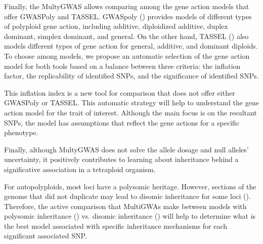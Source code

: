 \documentclass{article}
\begin{document}
Finally, the MultyGWAS allows comparing among the gene action models that offer GWASPoly and TASSEL.  GWASpoly (\cite{Rosyara2016}) provides models of different types of polyploid gene action, including additive, diploidized additive, duplex dominant, simplex dominant, and general. On the other hand, TASSEL (\cite{Bradbury2007}) also models different types of gene action for general, additive, and dominant diploids. To choose among models, we propose an automatic selection of the gene action model for both tools based on a balance between three criteria: the inflation factor, the replicability of identified SNPs, and the significance of identified SNPs. 

This inflation index is a new tool for comparison that does not offer either GWASPoly or TASSEL. This automatic strategy will help to understand the gene action model for the trait of interest. Although the main focus is on the resultant SNPs, the model has assumptions that reflect the gene actions for a specific phenotype.

Finally, although MultyGWAS does not solve the allele dosage and null alleles' uncertainty, it positively contributes to learning about inheritance behind a significative association in a tetraploid organism.  

For autopolyploids, most loci have a polysomic heritage. However, sections of the genome that did not duplicate may lead to disomic inheritance for some loci (\cite{ohno1970, lynch2000,dufresne2014}). 
Therefore, the active comparison that MultiGWAs make between models with polysomic inheritance (\cite{Rosyara2016, Shen2016}) vs. disomic inheritance (\cite{Purcell2007, Bradbury2007}) will help to determine what is the best model associated with specific inheritance mechanisms for each significant associated SNP.  

\end{document}
